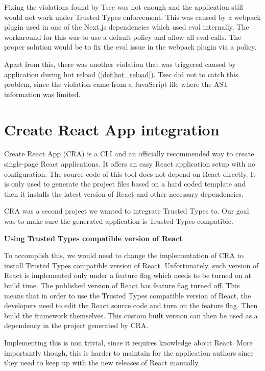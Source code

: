 Fixing the violations found by Tsec was not enough and the application still would not work under
Trusted Types enforcement. This was caused by a webpack plugin used in one of the Next.js
dependencies which used eval internally. The workaround for this was to use a default policy and
allow all eval calls. The proper solution would be to fix the eval issue in the webpack plugin via a
policy.

Apart from this, there was another violation that was triggered caused by application during hot
reload (\ref{def:hot_reload}). Tsec did not to catch this problem, since the violation came from a
JavaScript file where the AST information was limited.

\section{Create React App integration}

Create React App (CRA) is a CLI and an officially recommended way to create single-page React
applications. It offers an easy React application setup with no configuration. The source code of
this tool does not depend on React directly. It is only used to generate the project files based on
a hard coded template and then it installs the latest version of React and other necessary
dependencies.

CRA was a second project we wanted to integrate Trusted Types to. Our goal was to make sure the
generated application is Trusted Types compatible.

\medskip
\begin{flushleft}\textbf {Using Trusted Types compatible version of React}\end{flushleft}
\medskip

To accomplish this, we would need to change the implementation of CRA to install Trusted Types
compatible version of React. Unfortunately, such version of React is implemented only under a
feature flag which needs to be turned on at build time. The published version of React has feature
flag turned off. This means that in order to use the Trusted Types compatible version of React, the
developers need to edit the React source code and turn on the feature flag. Then build the framework
themselves. This custom built version can then be used as a dependency in the project generated by
CRA.

Implementing this is non trivial, since it requires knowledge about React. More importantly though,
this is harder to maintain for the application authors since they need to keep up with the new
releases of React manually.


